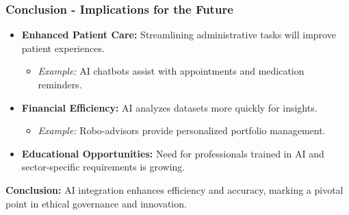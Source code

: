 \documentclass[aspectratio=169]{beamer}
\begin{document}
\begin{frame}[fragile]
    \frametitle{Conclusion - Implications for the Future}
    \begin{itemize}
        \item \textbf{Enhanced Patient Care:} Streamlining administrative tasks will improve patient experiences.
            \begin{itemize}
                \item \textit{Example:} AI chatbots assist with appointments and medication reminders.
            \end{itemize}

        \item \textbf{Financial Efficiency:} AI analyzes datasets more quickly for insights.
            \begin{itemize}
                \item \textit{Example:} Robo-advisors provide personalized portfolio management.
            \end{itemize}

        \item \textbf{Educational Opportunities:} Need for professionals trained in AI and sector-specific requirements is growing.
    \end{itemize}

    \textbf{Conclusion:} AI integration enhances efficiency and accuracy, marking a pivotal point in ethical governance and innovation.
\end{frame}
\end{document}
